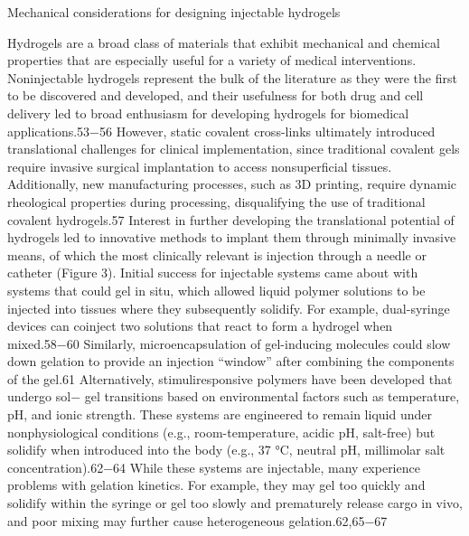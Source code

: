 \documentclass[../../main-notes.tex]{subfiles}
\begin{document}
Mechanical considerations for designing injectable hydrogels

Hydrogels are a broad class of materials that exhibit mechanical and chemical properties that are especially useful for a variety of medical interventions. 
Noninjectable hydrogels represent the bulk of the literature as they were the first to be discovered and developed, and their usefulness for both drug and cell delivery led to broad enthusiasm for developing hydrogels for biomedical applications.53−56  
However, static covalent cross-links ultimately introduced translational challenges for clinical implementation, since traditional covalent gels require invasive surgical implantation to access nonsuperficial tissues.  
Additionally, new manufacturing processes, such as 3D printing, require dynamic rheological properties during processing, disqualifying the use of traditional covalent  hydrogels.57  
Interest in further developing the translational potential of hydrogels led to innovative methods to implant them through minimally invasive means, of which the most clinically relevant is injection through a needle or catheter (Figure 3).  
Initial success for injectable systems came about with systems that could gel in situ, which allowed liquid polymer solutions to be injected into tissues where they subsequently solidify.  
For example, dual-syringe devices can coinject two  solutions that react to form a hydrogel when mixed.58−60  
Similarly, microencapsulation of gel-inducing molecules could slow down gelation to provide an injection “window” after  combining the components of the gel.61  
Alternatively, stimuliresponsive polymers have been developed that undergo sol− gel transitions based on environmental factors such as temperature, pH, and ionic strength.  
These systems are engineered to remain liquid under nonphysiological conditions (e.g., room-temperature, acidic pH, salt-free) but solidify when introduced into the body (e.g., 37 °C, neutral pH, millimolar  salt concentration).62−64  
While these systems are injectable, many experience problems with gelation kinetics.  
For example, they may gel too quickly and solidify within the syringe or gel too slowly and prematurely release cargo in vivo, and poor  mixing may further cause heterogeneous gelation.62,65−67
\end{document}
